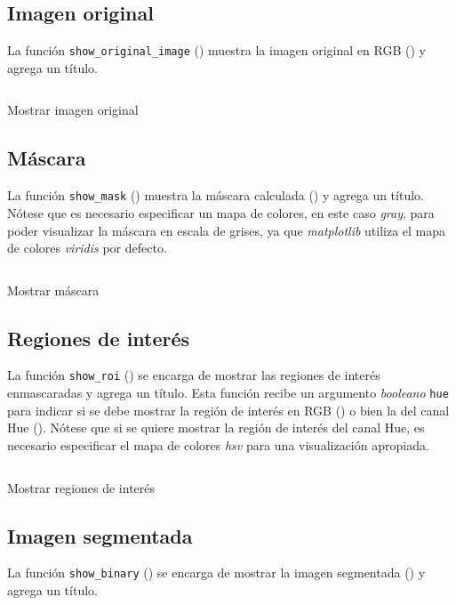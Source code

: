 \subsection{Imagen original}
La función \texttt{show\_original\_image} () muestra la imagen original en \textsf{RGB} () y agrega un título.

\begin{listing}[H]
\inputminted{python}{code_listings/show_original_image.py}
\caption{Mostrar imagen original}
\label{code:show_original_image}
\end{listing}

\subsection{Máscara}
La función \texttt{show\_mask} () muestra la máscara calculada () y agrega un título. Nótese que es necesario especificar un mapa de colores, en este caso \textit{gray}, para poder visualizar la máscara en escala de grises, ya que \textit{matplotlib} utiliza el mapa de colores \textit{viridis} por defecto.

\begin{listing}[H]
\inputminted{python}{code_listings/show_mask.py}
\caption{Mostrar máscara}
\label{code:show_mask}
\end{listing}

\subsection{Regiones de interés}
La función \texttt{show\_roi} () se encarga de mostrar las regiones de interés enmascaradas y agrega un título. Esta función recibe un argumento \textit{booleano} \texttt{hue} para indicar si se debe mostrar la región de interés en \textsf{RGB} () o bien la del canal Hue (). Nótese que si se quiere mostrar la región de interés del canal Hue, es necesario especificar el mapa de colores \textit{hsv} para una visualización apropiada.

\begin{listing}[H]
\inputminted{python}{code_listings/show_roi.py}
\caption{Mostrar regiones de interés}
\label{code:show_roi}
\end{listing}

\subsection{Imagen segmentada}
La función \texttt{show\_binary} () se encarga de mostrar la imagen segmentada () y agrega un título.


